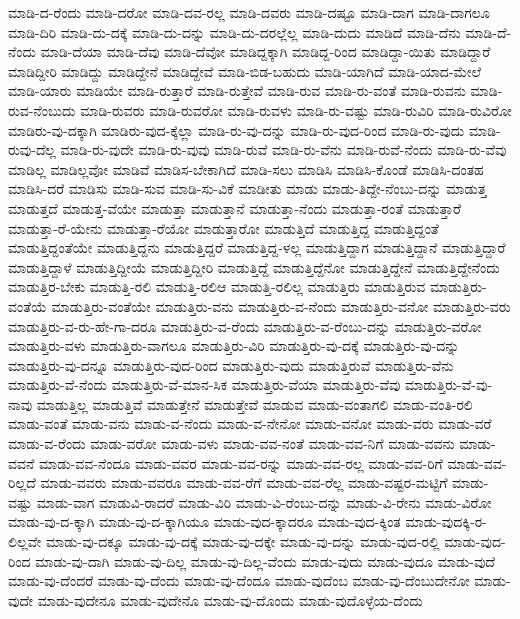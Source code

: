{ಮಾಡಿ-ದ-ರೆಂದು
ಮಾಡಿ-ದರೋ
ಮಾಡಿ-ದವ-ರಲ್ಲ
ಮಾಡಿ-ದವರು
ಮಾಡಿ-ದಷ್ಟೂ
ಮಾಡಿ-ದಾಗ
ಮಾಡಿ-ದಾಗಲೂ
ಮಾಡಿ-ದಿರಿ
ಮಾಡಿ-ದು-ದಕ್ಕೆ
ಮಾಡಿ-ದು-ದನ್ನು
ಮಾಡಿ-ದು-ದರಲ್ಲೆಲ್ಲ
ಮಾಡಿ-ದುದು
ಮಾಡಿದೆ
ಮಾಡಿ-ದೆನು
ಮಾಡಿ-ದೆ-ನೆಂದು
ಮಾಡಿ-ದೆಯಾ
ಮಾಡಿ-ದೆವು
ಮಾಡಿ-ದೆವೋ
ಮಾಡಿದ್ದಕ್ಕಾಗಿ
ಮಾಡಿದ್ದ-ರಿಂದ
ಮಾಡಿದ್ದಾ-ಯಿತು
ಮಾಡಿದ್ದಾರೆ
ಮಾಡಿದ್ದೀರಿ
ಮಾಡಿದ್ದು
ಮಾಡಿದ್ದೇನೆ
ಮಾಡಿದ್ದೇವೆ
ಮಾಡಿ-ಬಿಡ-ಬಹುದು
ಮಾಡಿ-ಯಾಗಿದೆ
ಮಾಡಿ-ಯಾದ-ಮೇಲೆ
ಮಾಡಿ-ಯಾರು
ಮಾಡಿಯೇ
ಮಾಡಿ-ರುತ್ತಾರೆ
ಮಾಡಿ-ರುತ್ತೇವೆ
ಮಾಡಿ-ರುವ
ಮಾಡಿ-ರು-ವಂತೆ
ಮಾಡಿ-ರುವನು
ಮಾಡಿ-ರುವ-ನೆಂಬುದು
ಮಾಡಿ-ರುವರು
ಮಾಡಿ-ರುವರೋ
ಮಾಡಿ-ರುವಳು
ಮಾಡಿ-ರು-ವಷ್ಟು
ಮಾಡಿ-ರುವಿರಿ
ಮಾಡಿ-ರುವಿರೋ
ಮಾಡಿರು-ವು-ದಕ್ಕಾಗಿ
ಮಾಡಿರು-ವುದ-ಕ್ಕೆಲ್ಲಾ
ಮಾಡಿ-ರು-ವು-ದನ್ನು
ಮಾಡಿ-ರು-ವುದ-ರಿಂದ
ಮಾಡಿ-ರು-ವುದು
ಮಾಡಿ-ರುವು-ದೆಲ್ಲ
ಮಾಡಿ-ರು-ವುದೇ
ಮಾಡಿ-ರು-ವುವು
ಮಾಡಿ-ರುವೆ
ಮಾಡಿ-ರು-ವೆನು
ಮಾಡಿ-ರುವೆ-ನೆಂದು
ಮಾಡಿ-ರು-ವೆವು
ಮಾಡಿಲ್ಲ
ಮಾಡಿಲ್ಲವೋ
ಮಾಡಿವೆ
ಮಾಡಿಸ-ಬೇಕಾಗಿದೆ
ಮಾಡಿ-ಸಲು
ಮಾಡಿಸಿ
ಮಾಡಿಸಿ-ಕೊಂಡೆ
ಮಾಡಿಸಿ-ದಂತಹ
ಮಾಡಿಸಿ-ದರೆ
ಮಾಡಿಸು
ಮಾಡಿ-ಸುವ
ಮಾಡಿ-ಸು-ವಿಕೆ
ಮಾಡೀತು
ಮಾಡು
ಮಾಡು-ತಿದ್ದೇ-ನೆಂಬು-ದನ್ನು
ಮಾಡುತ್ತ
ಮಾಡುತ್ತದೆ
ಮಾಡುತ್ತ-ವೆಯೇ
ಮಾಡುತ್ತಾ
ಮಾಡುತ್ತಾನೆ
ಮಾಡುತ್ತಾ-ನೆಂದು
ಮಾಡುತ್ತಾ-ರಂತೆ
ಮಾಡುತ್ತಾರೆ
ಮಾಡುತ್ತಾ-ರೆ-ಯೇನು
ಮಾಡುತ್ತಾ-ರೆಯೋ
ಮಾಡುತ್ತಾರೋ
ಮಾಡುತ್ತಿದೆ
ಮಾಡುತ್ತಿದ್ದ
ಮಾಡುತ್ತಿದ್ದಂತೆ
ಮಾಡುತ್ತಿದ್ದಂತೆಯೇ
ಮಾಡುತ್ತಿದ್ದನು
ಮಾಡುತ್ತಿದ್ದರೆ
ಮಾಡುತ್ತಿದ್ದ-ಳಲ್ಲ
ಮಾಡುತ್ತಿದ್ದಾಗ
ಮಾಡುತ್ತಿದ್ದಾನೆ
ಮಾಡುತ್ತಿದ್ದಾರೆ
ಮಾಡುತ್ತಿದ್ದಾಳೆ
ಮಾಡುತ್ತಿದ್ದೀಯೆ
ಮಾಡುತ್ತಿದ್ದೀರಿ
ಮಾಡುತ್ತಿದ್ದೆ
ಮಾಡುತ್ತಿದ್ದೆನೋ
ಮಾಡುತ್ತಿದ್ದೇನೆ
ಮಾಡುತ್ತಿದ್ದೇನೆಂದು
ಮಾಡುತ್ತಿರ-ಬೇಕು
ಮಾಡುತ್ತಿ-ರಲಿ
ಮಾಡುತ್ತಿ-ರಲಿಆ
ಮಾಡುತ್ತಿ-ರಲಿಲ್ಲ
ಮಾಡುತ್ತಿರು
ಮಾಡುತ್ತಿರುವ
ಮಾಡುತ್ತಿರು-ವಂತೆಯೆ
ಮಾಡುತ್ತಿರು-ವಂತೆಯೇ
ಮಾಡುತ್ತಿರು-ವನು
ಮಾಡುತ್ತಿರು-ವ-ನೆಂದು
ಮಾಡುತ್ತಿರು-ವನೋ
ಮಾಡುತ್ತಿರು-ವರು
ಮಾಡುತ್ತಿರು-ವ-ರು-ಹೇ-ಗಾ-ದರೂ
ಮಾಡುತ್ತಿರು-ವ-ರೆಂದು
ಮಾಡುತ್ತಿರು-ವ-ರೆಂಬು-ದನ್ನು
ಮಾಡುತ್ತಿರು-ವರೋ
ಮಾಡುತ್ತಿರು-ವಳು
ಮಾಡುತ್ತಿರು-ವಾಗಲೂ
ಮಾಡುತ್ತಿರು-ವಿರಿ
ಮಾಡುತ್ತಿರು-ವು-ದಕ್ಕೆ
ಮಾಡುತ್ತಿರು-ವು-ದನ್ನು
ಮಾಡುತ್ತಿರು-ವು-ದನ್ನೂ
ಮಾಡುತ್ತಿರು-ವುದ-ರಿಂದ
ಮಾಡುತ್ತಿರು-ವುದು
ಮಾಡುತ್ತಿರುವೆ
ಮಾಡುತ್ತಿರು-ವೆನು
ಮಾಡುತ್ತಿರು-ವೆ-ನೆಂದು
ಮಾಡುತ್ತಿರು-ವೆ-ಮಾನ-ಸಿಕ
ಮಾಡುತ್ತಿರು-ವೆಯಾ
ಮಾಡುತ್ತಿರು-ವೆವು
ಮಾಡುತ್ತಿರು-ವೆ-ವು-ನಾವು
ಮಾಡುತ್ತಿಲ್ಲ
ಮಾಡುತ್ತಿವೆ
ಮಾಡುತ್ತೇನೆ
ಮಾಡುತ್ತೇವೆ
ಮಾಡುವ
ಮಾಡು-ವಂತಾಗಲಿ
ಮಾಡು-ವಂತಿ-ರಲಿ
ಮಾಡು-ವಂತೆ
ಮಾಡು-ವನು
ಮಾಡು-ವ-ನೆಂದು
ಮಾಡು-ವ-ನೇನೋ
ಮಾಡು-ವನೋ
ಮಾಡು-ವರು
ಮಾಡು-ವರೆ
ಮಾಡು-ವ-ರೆಂದು
ಮಾಡು-ವರೋ
ಮಾಡು-ವಳು
ಮಾಡು-ವವ-ನಂತೆ
ಮಾಡು-ವವ-ನಿಗೆ
ಮಾಡು-ವವನು
ಮಾಡು-ವವನೆ
ಮಾಡು-ವವ-ನೆಂದೂ
ಮಾಡು-ವವರ
ಮಾಡು-ವವ-ರನ್ನು
ಮಾಡು-ವವ-ರಲ್ಲ
ಮಾಡು-ವವ-ರಿಗೆ
ಮಾಡು-ವವ-ರಿಲ್ಲದೆ
ಮಾಡು-ವವರು
ಮಾಡು-ವವರೂ
ಮಾಡು-ವವ-ರೆಗೆ
ಮಾಡು-ವವ-ರೆಲ್ಲ
ಮಾಡು-ವಷ್ಟರ-ಮಟ್ಟಿಗೆ
ಮಾಡು-ವಷ್ಟು
ಮಾಡು-ವಾಗ
ಮಾಡುವಿ-ರಾದರೆ
ಮಾಡು-ವಿರಿ
ಮಾಡು-ವಿ-ರೆಂಬು-ದನ್ನು
ಮಾಡು-ವಿ-ರೇನು
ಮಾಡು-ವಿರೋ
ಮಾಡು-ವು-ದ-ಕ್ಕಾಗಿ
ಮಾಡು-ವು-ದ-ಕ್ಕಾಗಿಯೂ
ಮಾಡು-ವುದ-ಕ್ಕಾದರೂ
ಮಾಡು-ವುದ-ಕ್ಕಿಂತ
ಮಾಡು-ವುದಕ್ಕಿ-ರ-ಲಿಲ್ಲವೇ
ಮಾಡು-ವು-ದಕ್ಕೂ
ಮಾಡು-ವು-ದಕ್ಕೆ
ಮಾಡು-ವು-ದಕ್ಕೇ
ಮಾಡು-ವು-ದನ್ನು
ಮಾಡು-ವುದ-ರಲ್ಲಿ
ಮಾಡು-ವುದ-ರಿಂದ
ಮಾಡು-ವು-ದಾಗಿ
ಮಾಡು-ವು-ದಿಲ್ಲ
ಮಾಡು-ವು-ದಿಲ್ಲ-ವೆಂದು
ಮಾಡು-ವುದು
ಮಾಡು-ವುದೂ
ಮಾಡು-ವುದೆ
ಮಾಡು-ವು-ದೆಂದರೆ
ಮಾಡು-ವು-ದೆಂದು
ಮಾಡು-ವು-ದೆಂದೂ
ಮಾಡು-ವುದೆಂಬ
ಮಾಡು-ವು-ದೆಂಬುದೇನೋ
ಮಾಡು-ವುದೇ
ಮಾಡು-ವುದೇನೂ
ಮಾಡು-ವುದೇನೊ
ಮಾಡು-ವು-ದೊಂದು
ಮಾಡು-ವುದೊಳ್ಳೆಯ-ದೆಂದು
}
